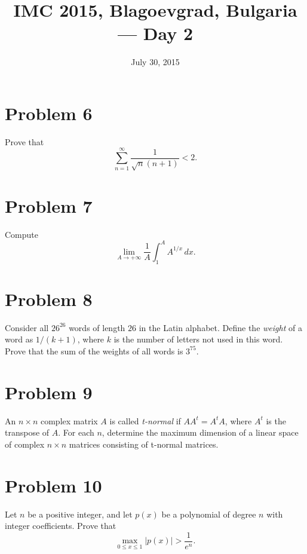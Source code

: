 \documentclass{article}
\title{IMC 2015, Blagoevgrad, Bulgaria --- Day 2}
\date{July 30, 2015}
\begin{document}
\maketitle

\section*{Problem 6}
Prove that
\[ \sum_{n=1}^\infty \frac{1}{\sqrt{n}(n+1)} < 2. \]

\section*{Problem 7}
Compute
\[ \lim_{A \to +\infty} \frac{1}{A} \int_1^A A^{1/x}\,dx. \]

\section*{Problem 8}
Consider all $26^{26}$ words of length $26$ in the Latin alphabet. Define the \emph{weight} of a word as $1/(k+1)$, where $k$ is the number of letters not used in this word. Prove that the sum of the weights of all words is $3^{75}$.

\section*{Problem 9}
An $n \times n$ complex matrix $A$ is called \emph{t-normal} if $A A^t = A^t A$, where $A^t$ is the transpose of $A$. For each $n$, determine the maximum dimension of a linear space of complex $n \times n$ matrices consisting of t-normal matrices.

\section*{Problem 10}
Let $n$ be a positive integer, and let $p(x)$ be a polynomial of degree $n$ with integer coefficients. Prove that
\[ \max_{0 \le x \le 1} |p(x)| > \frac{1}{e^n}. \]
\end{document}
